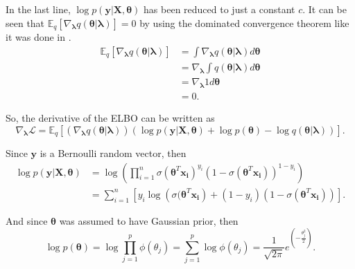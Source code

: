 In the last line, $\log p(\boldsymbol{y} | \boldsymbol{X}, \boldsymbol{\theta})$ has been reduced to just a constant $c$. It can be seen that $\mathbb{E}_q \left[ \nabla_{\boldsymbol{\lambda}} q(\boldsymbol{\theta} | \boldsymbol{\lambda}) \right] = 0$ by using the dominated convergence theorem like it was done in \cite{ranganath2014black}.
\begin{equation}
  \begin{split}
      \mathbb{E}_q \left[ \nabla_{\boldsymbol{\lambda}} q(\boldsymbol{\theta} | \boldsymbol{\lambda}) \right] &=
      \int \nabla_{\boldsymbol{\lambda}} q(\boldsymbol{\theta} | \boldsymbol{\lambda}) d\boldsymbol{\theta} \\
      &= \nabla_{\boldsymbol{\lambda}} \int q(\boldsymbol{\theta} | \boldsymbol{\lambda}) d\boldsymbol{\theta} \\
      &= \nabla_{\boldsymbol{\lambda}} 1 d\boldsymbol{\theta} \\
      &= 0.
  \end{split}
\end{equation}

So, the derivative of the ELBO can be written as
\begin{equation}
  \nabla_{\boldsymbol{\lambda}} \mathcal{L} = \mathbb{E}_q \left[ \left( \nabla_{\boldsymbol{\lambda}} q(\boldsymbol{\theta} | \boldsymbol{\lambda}) \right) \left( \log p(\boldsymbol{y} | \boldsymbol{X}, \boldsymbol{\theta}) + \log p(\boldsymbol{\theta}) - \log q(\boldsymbol{\theta} | \boldsymbol{\lambda}) \right) \right].
\end{equation}

Since $\boldsymbol{y}$ is a Bernoulli random vector, then
\begin{equation}
  \begin{split}
      \log p(\boldsymbol{y} | \boldsymbol{X}, \boldsymbol{\theta}) &=
      \log \left( \prod_{i = 1}^n \sigma(\boldsymbol{\theta}^T \boldsymbol{x_i})^{y_i} (1 - \sigma(\boldsymbol{\theta}^T \boldsymbol{x_i}))^{1-y_i} \right) \\
      &= \sum_{i = 1}^n \left[ y_i \log \left( \sigma(\boldsymbol{\theta}^T \boldsymbol{x_i} \right) + (1 - y_i) (1 - \sigma(\boldsymbol{\theta}^T \boldsymbol{x_i})) \right].
  \end{split}
\end{equation}

And since $\boldsymbol{\theta}$ was assumed to have Gaussian prior, then
\begin{equation}
  \log p(\boldsymbol{\theta}) = \log \prod_{j = 1}^p \phi(\theta_j) = \sum_{j = 1}^p \log \phi(\theta_j) = \frac{1}{\sqrt{2 \pi}} e^{\left( -\frac{\theta_j^2}{2} \right)}.
\end{equation}

